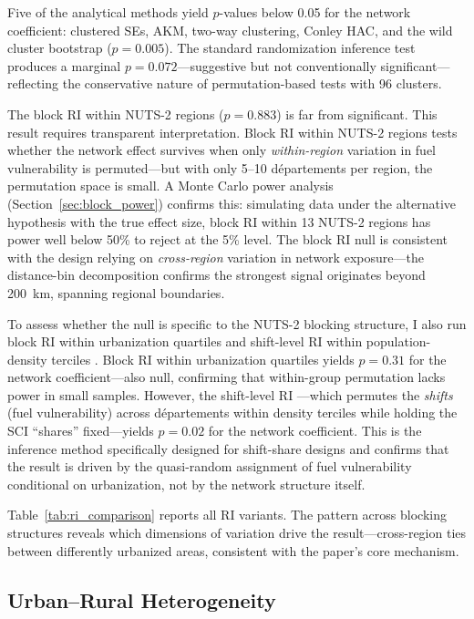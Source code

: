 \documentclass[12pt]{article}
\newcommand{\depts}{d\'{e}partements}
\begin{document}
Five of the analytical methods yield $p$-values below 0.05 for the network coefficient: clustered SEs, AKM, two-way clustering, Conley HAC, and the wild cluster bootstrap ($p = 0.005$). The standard randomization inference test produces a marginal $p = 0.072$---suggestive but not conventionally significant---reflecting the conservative nature of permutation-based tests with 96 clusters.

The block RI within NUTS-2 regions ($p = 0.883$) is far from significant. This result requires transparent interpretation. Block RI within NUTS-2 regions tests whether the network effect survives when only \emph{within-region} variation in fuel vulnerability is permuted---but with only 5--10 \depts{} per region, the permutation space is small. A Monte Carlo power analysis (Section~\ref{sec:block_power}) confirms this: simulating data under the alternative hypothesis with the true effect size, block RI within 13 NUTS-2 regions has power well below 50\% to reject at the 5\% level. The block RI null is consistent with the design relying on \emph{cross-region} variation in network exposure---the distance-bin decomposition confirms the strongest signal originates beyond 200~km, spanning regional boundaries.

To assess whether the null is specific to the NUTS-2 blocking structure, I also run block RI within urbanization quartiles and shift-level RI within population-density terciles \citep{borusyak2022quasi}. Block RI within urbanization quartiles yields $p = 0.31$ for the network coefficient---also null, confirming that within-group permutation lacks power in small samples. However, the shift-level RI \citep{borusyak2022quasi}---which permutes the \emph{shifts} (fuel vulnerability) across \depts{} within density terciles while holding the SCI ``shares'' fixed---yields $p = 0.02$ for the network coefficient. This is the inference method specifically designed for shift-share designs and confirms that the result is driven by the quasi-random assignment of fuel vulnerability conditional on urbanization, not by the network structure itself. 

Table~\ref{tab:ri_comparison} reports all RI variants. The pattern across blocking structures reveals which dimensions of variation drive the result---cross-region ties between differently urbanized areas, consistent with the paper's core mechanism.

\subsection{Urban--Rural Heterogeneity}
\end{document}
